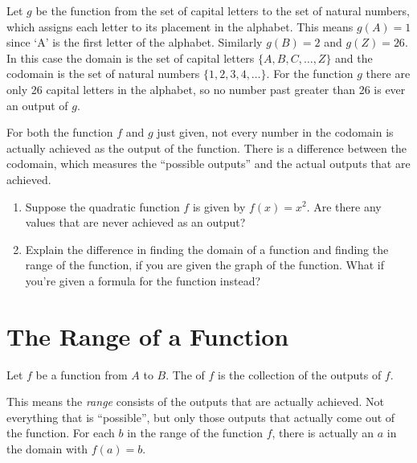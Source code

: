 \documentclass[nooutcomes]{ximera}
\begin{document}
	Let $g$ be the function from the set of capital letters to the set of natural numbers, which assigns each letter to its placement in the alphabet. 
	This means $g(A)=1$ since `A' is the first letter of the alphabet. Similarly $g(B) = 2$ and $g(Z)=26$. In this case the domain is the set of capital
	letters $\{ A, B, C, \ldots, Z\}$ and the codomain is the set of natural numbers $\{1, 2, 3, 4, \ldots \}$. For the function $g$
	there are only 26 capital letters in the alphabet, so no number past greater than 26 is ever an output of $g$.  
	
	For both the function $f$ and $g$ just given, not every number in the codomain is actually achieved as the output of the function. 
	There is a difference between the codomain, which measures the ``possible outputs'' and the actual outputs that are achieved.	
	
	
	\begin{exploration}
		\begin{enumerate}[label=\alph*.]
			\item Suppose the quadratic function $f$ is given by $f(x) = x^2$. Are there any values that are never achieved as an output?
			\item Explain the difference in finding the domain of a function and finding the range of the function, if you are given the graph of the function. What if you're given a formula for the function instead?
		\end{enumerate}
	\end{exploration}


\section{The Range of a Function}
	

	
	
	\begin{definition}
		Let $f$ be a function from $A$ to $B$. The  of $f$ is the collection of the outputs of $f$.
	\end{definition}
	This means the \emph{range} consists of the outputs that are actually achieved. Not everything that is ``possible'', but only those outputs that actually
	come out of the function. For each $b$ in the range of the function $f$, there is actually an $a$ in the domain with $f(a) = b$.
\end{document}
